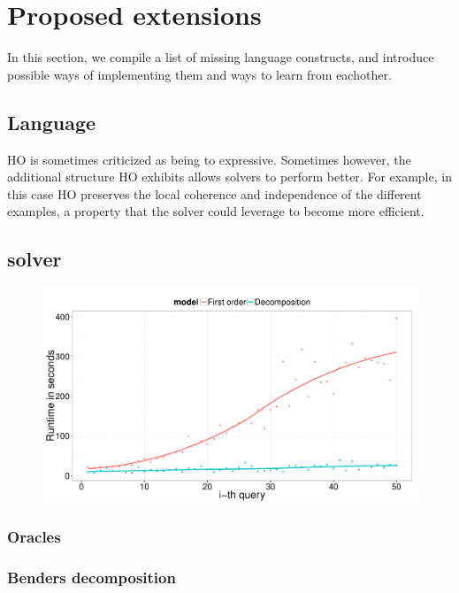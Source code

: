 \section{Proposed extensions}\label{sec:extension}
In this section, we compile a list of missing language constructs, and introduce possible ways of implementing them and ways to learn from eachother.
\subsection{Language}
HO is sometimes criticized as being to expressive.
Sometimes however, the additional structure HO exhibits allows solvers to perform better.
For example, in this case HO preserves the local coherence and independence of the different examples, a property that the solver could leverage to become more efficient.
\subsection{solver}

\begin{figure}
\includegraphics[width=\linewidth]{extra/figure_comparison_yoshida.pdf}
\end{figure}


\subsubsection{Oracles}
\subsubsection{Benders decomposition}

